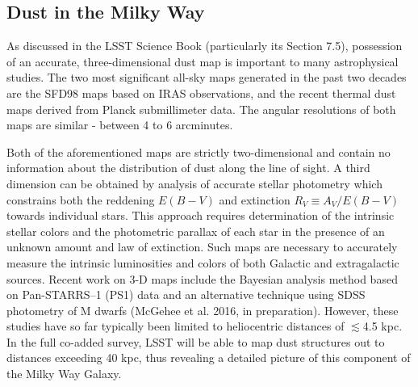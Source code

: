 %
%

\subsection{Dust in the Milky Way}
\def\secname{MW_Dust}\label{sec:\secname}


As discussed in the LSST Science Book (particularly its Section 7.5),
possession of an accurate, three-dimensional dust map is important to
many astrophysical studies. The two most significant all-sky maps
generated in the past two decades are the SFD98 maps based on IRAS
observations, and the recent thermal dust maps derived from Planck
submillimeter data. The angular resolutions of both maps are similar -
between 4 to 6 arcminutes.

Both of the aforementioned maps are strictly two-dimensional and contain
no information about the distribution of dust along the line of sight. A
third dimension can be obtained by analysis of accurate stellar
photometry which constrains both the reddening $E(B-V)$ and extinction
$R_V \equiv A_V/E(B-V)$ towards individual stars. This approach requires
determination of the intrinsic stellar colors and the photometric
parallax of each star in the presence of an unknown amount and law of
extinction. Such maps are necessary to accurately measure the intrinsic
luminosities and colors of both Galactic and extragalactic sources.
Recent work on 3-D maps include the Bayesian analysis method based on
Pan-STARRS--1 (PS1) data \citep{green15} and an alternative technique
using SDSS photometry of M dwarfs (McGehee et al. 2016, in preparation).
However, these studies have so far typically been limited to
heliocentric distances of $\lesssim$4.5 kpc. In the full co-added
survey, LSST will be able to map dust structures out to distances
exceeding 40 kpc, thus revealing a detailed picture of this component of
the Milky Way Galaxy.

